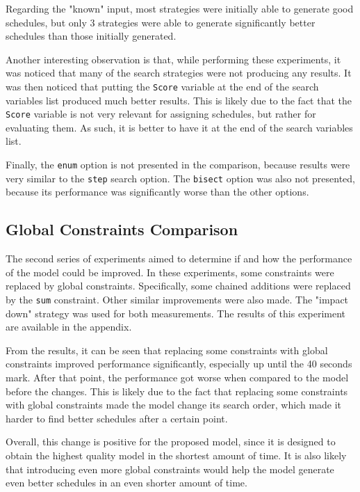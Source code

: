 \documentclass[conference]{IEEEtran}
\begin{document}
Regarding the "known" input, most strategies were initially able to generate good schedules, but only 3 strategies were able to generate significantly better schedules than those initially generated.

Another interesting observation is that, while performing these experiments, it was noticed that many of the search strategies were not producing any results. It was then noticed that putting the \texttt{Score} variable at the end of the search variables list produced much better results. This is likely due to the fact that the \texttt{Score} variable is not very relevant for assigning schedules, but rather for evaluating them. As such, it is better to have it at the end of the search variables list.

Finally, the \texttt{enum} option is not presented in the comparison, because results were very similar to the \texttt{step} search option. The \texttt{bisect} option was also not presented, because its performance was significantly worse than the other options.

\subsection{Global Constraints Comparison}

The second series of experiments aimed to determine if and how the performance of the model could be improved. In these experiments, some constraints were replaced by global constraints. Specifically, some chained additions were replaced by the \texttt{sum} constraint. Other similar improvements were also made. The "impact down" strategy was used for both measurements. The results of this experiment are available in the appendix.

From the results, it can be seen that replacing some constraints with global constraints improved performance significantly, especially up until the 40 seconds mark. After that point, the performance got worse when compared to the model before the changes. This is likely due to the fact that replacing some constraints with global constraints made the model change its search order, which made it harder to find better schedules after a certain point.

Overall, this change is positive for the proposed model, since it is designed to obtain the highest quality model in the shortest amount of time. It is also likely that introducing even more global constraints would help the model generate even better schedules in an even shorter amount of time. 
\end{document}
